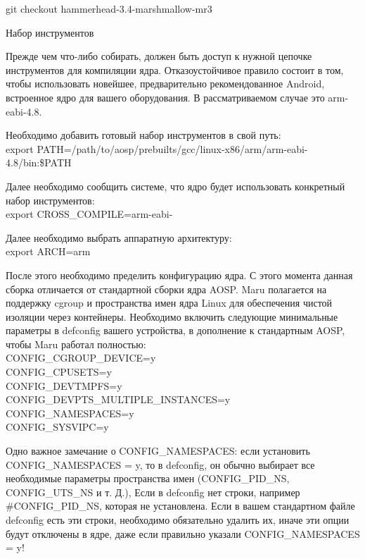 \documentclass[a4paper, 14pt]{article}
\begin{document}
git checkout hammerhead-3.4-marshmallow-mr3 \\

\par Набор инструментов
\par Прежде чем что-либо собирать, должен быть доступ к нужной цепочке инструментов для компиляции ядра.
Отказоустойчивое правило состоит в том, чтобы использовать новейшее, предварительно рекомендованное Android, встроенное ядро для вашего оборудования. В рассматриваемом случае это arm-eabi-4.8.

\par Необходимо добавить готовый набор инструментов в свой путь:\\

export PATH=/path/to/aosp/prebuilts/gcc/linux-x86/arm/arm-eabi-4.8/bin:\$PATH \\

\par Далее необходимо сообщить системе, что ядро будет использовать конкретный набор инструментов: \\

export CROSS\_COMPILE=arm-eabi- \\

\par Далее необходимо выбрать аппаратную архитектуру: \\

export ARCH=arm \\

\par После этого необходимо пределить конфигурацию ядра. С этого момента данная сборка отличается от стандартной сборки ядра AOSP. Maru полагается на поддержку cgroup и пространства имен ядра Linux для обеспечения чистой изоляции через контейнеры. Необходимо включить следующие минимальные параметры в defconfig вашего устройства, в дополнение к стандартным AOSP, чтобы Maru работал полностью: \\
CONFIG\_CGROUP\_DEVICE=y \\
CONFIG\_CPUSETS=y \\
CONFIG\_DEVTMPFS=y \\
CONFIG\_DEVPTS\_MULTIPLE\_INSTANCES=y \\
CONFIG\_NAMESPACES=y \\
CONFIG\_SYSVIPC=y \\

\par Одно важное замечание о CONFIG\_NAMESPACES: если установить CONFIG\_NAMESPACES = y, то в defconfig, он обычно выбирает все необходимые параметры пространства имен (CONFIG\_PID\_NS, CONFIG\_UTS\_NS и т. Д.), Если в defconfig нет строки, например \#CONFIG\_PID\_NS, которая не установлена. Если в вашем стандартном файле defconfig есть эти строки, необходимо обязательно удалить их, иначе эти опции будут отключены в ядре, даже если правильно указали CONFIG\_NAMESPACES = y!
\end{document}

